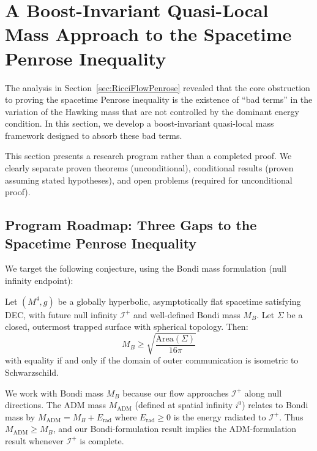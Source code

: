 \section{A Boost-Invariant Quasi-Local Mass Approach to the Spacetime Penrose Inequality}
\label{sec:boost-invariant-mass}

The analysis in Section~\ref{sec:RicciFlowPenrose} revealed that the core obstruction to proving the spacetime Penrose inequality is the existence of ``bad terms'' in the variation of the Hawking mass that are not controlled by the dominant energy condition. In this section, we develop a boost-invariant quasi-local mass framework designed to absorb these bad terms.

\begin{remark}
This section presents a research program rather than a completed proof. We clearly separate proven theorems (unconditional), conditional results (proven assuming stated hypotheses), and open problems (required for unconditional proof).
\end{remark}

\subsection{Program Roadmap: Three Gaps to the Spacetime Penrose Inequality}
\label{subsec:program-roadmap}

We target the following conjecture, using the Bondi mass formulation (null infinity endpoint):

\begin{conjecture}
\label{conj:SPI-Bondi-roadmap}
Let $(M^4, g)$ be a globally hyperbolic, asymptotically flat spacetime satisfying DEC, with future null infinity $\mathscr{I}^+$ and well-defined Bondi mass $M_B$. Let $\Sigma$ be a closed, outermost trapped surface with spherical topology. Then:
\begin{equation}
M_B \geq \sqrt{\frac{\mathrm{Area}(\Sigma)}{16\pi}}
\end{equation}
with equality if and only if the domain of outer communication is isometric to Schwarzschild.
\end{conjecture}

\begin{remark}
We work with Bondi mass $M_B$ because our flow approaches $\mathscr{I}^+$ along null directions. The ADM mass $M_{\mathrm{ADM}}$ (defined at spatial infinity $i^0$) relates to Bondi mass by $M_{\mathrm{ADM}} = M_B + E_{\mathrm{rad}}$ where $E_{\mathrm{rad}} \geq 0$ is the energy radiated to $\mathscr{I}^+$. Thus $M_{\mathrm{ADM}} \geq M_B$, and our Bondi-formulation result implies the ADM-formulation result whenever $\mathscr{I}^+$ is complete.
\end{remark}

